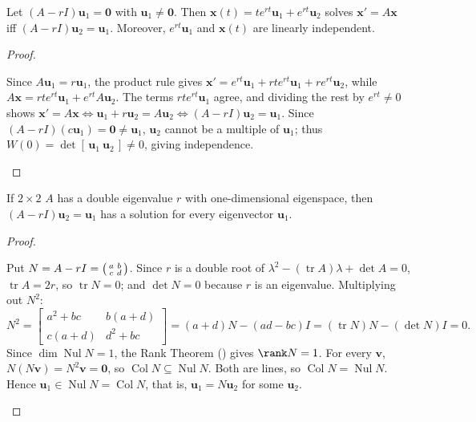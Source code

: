 \documentclass[10pt]{scrartcl}
\newcommand{\vv}[1]{\mathbf{#1}}
\DeclareMathOperator{\Col}{Col}
\DeclareMathOperator{\Nul}{Nul}
\DeclareMathOperator{\tr}{tr}
\begin{document}
\begin{proposition*}
  Let $(A-rI)\vv u_1=\vv 0$ with $\vv u_1\neq\vv 0$. Then $\vv x(t)=te^{rt}\vv u_1+e^{rt}\vv u_2$ solves $\vv x'=A\vv x$ iff $(A-rI)\vv u_2=\vv u_1$. Moreover, $e^{rt}\vv u_1$ and $\vv x(t)$ are linearly independent.
\end{proposition*}
\begin{proof}
  \begin{steps}
    \ii Since $A\vv u_1=r\vv u_1$, the product rule gives $\vv x'=e^{rt}\vv u_1+rte^{rt}\vv u_1+re^{rt}\vv u_2$, while $A\vv x=rte^{rt}\vv u_1+e^{rt}A\vv u_2$. The terms $rte^{rt}\vv u_1$ agree, and dividing the rest by $e^{rt}\neq 0$ shows $\vv x'=A\vv x \iff \vv u_1+r\vv u_2=A\vv u_2 \iff (A-rI)\vv u_2=\vv u_1$.
    \ii Since $(A-rI)(c\vv u_1)=\vv 0\neq\vv u_1$, $\vv u_2$ cannot be a multiple of $\vv u_1$; thus $W(0)=\det[\,\vv u_1\ \vv u_2\,]\neq 0$, giving independence. \qedhere
  \end{steps}
\end{proof}

\begin{proposition*}[Solvability of $(A-rI)\vv u_2=\vv u_1$ in $2\times 2$]
  If $2\times 2$ $A$ has a double eigenvalue $r$ with one-dimensional eigenspace, then $(A-rI)\vv u_2=\vv u_1$ has a solution for every eigenvector $\vv u_1$.
\end{proposition*}
\begin{proof}
  \begin{steps}
    \ii Put $N=A-rI=\begin{psmallmatrix}a&b\\c&d\end{psmallmatrix}$. Since $r$ is a double root of $\lambda^2-(\tr A)\lambda+\det A=0$, $\tr A=2r$, so $\tr N=0$; and $\det N=0$ because $r$ is an eigenvalue. Multiplying out $N^2$:
    \[
      N^2 = \begin{bmatrix}a^2+bc&b(a+d)\\c(a+d)&d^2+bc\end{bmatrix} = (a+d)N-(ad-bc)I = (\tr N)N-(\det N)I = 0.
    \]
    \ii Since $\dim\Nul N=1$, the Rank Theorem () gives $\rank N=1$.
    \ii For every $\vv v$, $N(N\vv v)=N^2\vv v=\vv 0$, so $\Col N\subseteq\Nul N$. Both are lines, so $\Col N=\Nul N$. Hence $\vv u_1\in\Nul N=\Col N$, that is, $\vv u_1=N\vv u_2$ for some $\vv u_2$. \qedhere
  \end{steps}
\end{proof}
\end{document}
